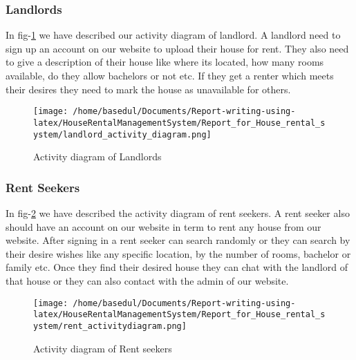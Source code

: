 \documentclass[12pt,a4paper]{article}
\newcommand\tab[1][.7cm]{\hspace*{#1}}
\begin{document}
    \subsubsection{Landlords}
    \tab In fig-\ref{fig:landlord-dfd} we have described our activity diagram of landlord. A landlord need to sign up an account on
our website to upload their house for rent. They also need to give a description of their house like where
its located, how many rooms available, do they allow bachelors or not etc. If they get a renter which
meets their desires they need to mark the house as unavailable for others.	
			\begin{figure}[H]
				\centering
				\texttt{[image: /home/basedul/Documents/Report-writing-using-latex/HouseRentalManagementSystem/Report\_for\_House\_rental\_system/landlord\_activity\_diagram.png]}
				\caption{\hspace{0.35em}Activity diagram of Landlords}
				\label{fig:landlord-dfd} 
			\end{figure}
			
	\subsubsection{Rent Seekers}
	\tab In fig-\ref{fig:rent-dfd} we have described the activity diagram of rent seekers. A rent seeker also should have an
account on our website in term to rent any house from our website. After signing in a rent seeker can
search randomly or they can search by their desire wishes like any specific location, by the number of
rooms, bachelor or family etc. Once they find their desired house they can chat with the landlord of that
house or they can also contact with the admin of our website.
			\begin{figure}[H]
				\centering
				\texttt{[image: /home/basedul/Documents/Report-writing-using-latex/HouseRentalManagementSystem/Report\_for\_House\_rental\_system/rent\_activitydiagram.png]}
				\caption{\hspace{0.35em}Activity diagram of Rent seekers}
				\label{fig:rent-dfd} 
			\end{figure}
\end{document}
